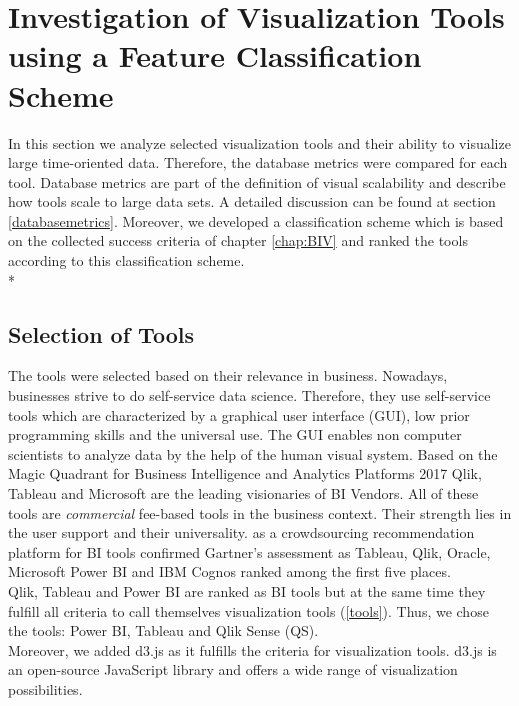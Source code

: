 \chapter{Investigation of Visualization Tools using a Feature Classification Scheme}
\label{chap:Tools}

In this section we analyze selected visualization tools and their ability to visualize large time-oriented data. Therefore, the database metrics were compared for each tool. Database metrics are part of the definition of visual scalability and describe how tools scale to large data sets. A detailed discussion can be found at section \ref{databasemetrics}. Moreover, we developed a classification scheme which is based on the collected success criteria of chapter \ref{chap:BIV} and ranked the tools according to this classification scheme. \\*

\section{Selection of Tools}\label{tool:selection}
The tools were selected based on their relevance in business. Nowadays, businesses strive to do self-service data science\cite{Russom2011,Parenteau2016,visualization2012making,curran2005self}. Therefore, they use self-service tools which are characterized by a graphical user interface (GUI), low prior programming skills and the universal use. The GUI enables non computer scientists to analyze data by the help of the human visual system. Based on the Magic Quadrant for Business Intelligence and Analytics Platforms 2017 \cite{Sallam2017} Qlik, Tableau and Microsoft are the leading visionaries of BI Vendors. All of these tools are \textit{commercial} fee-based tools in the business context. Their strength lies in the user support and their universality. \cite{ITCentralStation} as a crowdsourcing recommendation platform for BI tools confirmed Gartner's assessment as Tableau, Qlik, Oracle, Microsoft Power BI and IBM Cognos ranked among the first five places. \\
Qlik, Tableau and Power BI are ranked as BI tools but at the same time they fulfill all criteria to call themselves visualization tools (\ref{tools}).
Thus, we chose the tools: Power BI, Tableau and Qlik Sense (QS).\\
Moreover, we added d3.js as it fulfills the criteria for visualization tools. d3.js is an open-source JavaScript library and offers a wide range of visualization possibilities. \\



